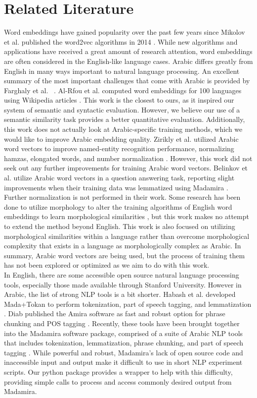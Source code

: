 \section{Related Literature}
\label{sec:literature}

Word embeddings have gained popularity over the past few years since Mikolov et al. published the word2vec algorithms in 2014 \cite{mikolovdist:2013,mikoloveffic:2013}. While new algorithms and applications have received a great amount of research attention, word embeddings are often considered in the English-like language cases. Arabic differs greatly from English in many ways important to natural language processing. An excellent summary of the most important challenges that come with Arabic is provided by Farghaly et al. ~\cite{farghaly:2009}. Al-Rfou et al. computed word embeddings for 100 languages using Wikipedia articles \cite{al:2013}. This work is the closest to ours, as it inspired our system of semantic and syntactic evaluation. However, we believe our use of a semantic similarity task provides a better quantitative evaluation. Additionally, this work does not actually look at Arabic-specific training methods, which we would like to improve Arabic embedding quality. Zirikly et al. utilized Arabic word vectors to improve named-entity recognition performance, normalizing hamzas, elongated words, and number normalization \cite{zirikly:2015}. However, this work did not seek out any further improvements for training Arabic word vectors. Belinkov et al. utilize Arabic word vectors in a question answering task, reporting slight improvements when their training data was lemmatized using Madamira \cite{belinkov:2015}. Further normalization is not performed in their work. Some research has been done to utilize morphology to alter the training algorithms of English word embeddings to learn morphological similarities \cite{luong2013better}, but this work makes no attempt to extend the method beyond English. This work is also focused on utilizing morphological similarities within a language rather than overcome morphological complexity that exists in a language as morphologically complex as Arabic. In summary, Arabic word vectors are being used, but the process of training them has not been explored or optimized as we aim to do with this work.
\\
In English, there are some accessible open source natural language processing tools, especially those made available through Stanford University. However in Arabic, the list of strong NLP tools is a bit shorter. Habash et al. developed Mada+Tokan to perform tokenization, part of speech tagging, and lemmatization \cite{habash:2009}. Diab published the Amira software as fast and robust option for phrase chunking and POS tagging \cite{diab:2009}. Recently, these tools have been brought together into the Madamira software package, comprised of a suite of Arabic NLP tools that includes tokenization, lemmatization, phrase chunking, and part of speech tagging \cite{pasha:2014}. While powerful and robust, Madamira's lack of open source code and inaccessible input and output make it difficult to use in short NLP experiment scripts. Our python package provides a wrapper to help with this difficulty, providing simple calls to process and access commonly desired output from Madamira.
